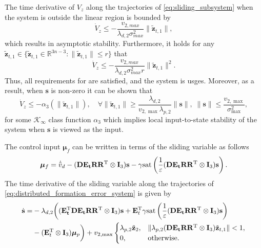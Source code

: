     The time derivative of $V_z$ along the trajectories of \eqref{eq:sliding_subsystem} when the system is outside the linear region is bounded by
    \begin{equation}
        \dot{V}_z \leq -\frac{v_{2,max}}{\lambda_{d,2}\sigma_{max}^2}\|\tilde{\mathbf{z}}_{t,1}\|,
    \end{equation}
which results in asymptotic stability. Furthermore, it holds for any $\tilde{\mathbf{z}}_{t,1} \in \{\tilde{\mathbf{z}}_{t,1} \in \mathbb R^{3n-3} \colon \|\tilde{\mathbf{z}}_{t,1}\| \leq r\}$ that
\begin{equation}
    \dot{V}_z \leq -\frac{v_{2,max}}{\lambda_{d,2}\sigma_{max}^2 r}\|\tilde{\mathbf{z}}_{t,1}\|^2.
\end{equation}
Thus, all requirements for \cite[Theorem 5]{pettersen_lyapunov_2017} are satisfied, and the system is \gls{usges}. Moreover, as a result, when $\mathbf{s}$ is non-zero it can be shown that
\begin{equation}\label{eq:local_iss}
    \dot{V}_z \leq -\alpha_3(\|\tilde{\mathbf{z}}_{t,1}\|), \quad \forall \|\tilde{\mathbf{z}}_{t,1}\| \geq \frac{\lambda_{d,2}}{v_{2,\max}\lambda_{p,2}}\|\mathbf{s}\|,\;
    \|\mathbf{s}\| \leq \frac{v_{2,\max}}{\sigma_{\max}^2}, 
\end{equation}
for some $\mathcal{K}_\infty$ class function $\alpha_3$ which implies local input-to-state stability of the system when $\mathbf{s}$ is viewed as the input.

    The control input $\bm{\mu}_f$ can be written in terms of the sliding variable as follows
    \begin{equation}
        \bm{\mu}_f = \dot{\tilde{v}}_d - (\mathbf{D E_t RR^{\rm T}}\otimes \mathbf{I}_3)\mathbf{s} - \gamma \mathrm{sat}\left(\frac{1}{\varepsilon}(\mathbf{D E_t RR^{\rm T}}\otimes \mathbf{I}_3)\mathbf{s}\right).
    \end{equation}
    The time derivative of the sliding variable along the trajectories of \eqref{eq:distributed_formation_error_system} is given by
    \begin{equation}\label{eq:sliding_derivative}
    \begin{split}
        \dot{\mathbf{s}} = &-\lambda_{d,2} \bigg((\mathbf{E_t^{\rm T} D E_t R R^{\rm T}} \otimes \mathbf{I}_3) \mathbf{s} + \mathbf{E}_t^{\rm T}\gamma \mathrm{sat}\left(\frac{1}{\varepsilon}(\mathbf{DE_t R R^{\rm T}}\otimes \mathbf{I}_3)\mathbf{s}\right)\\
        &- (\mathbf{E}_t^{\rm T}\otimes \mathbf{I}_3) \bm{\mu}_p\bigg) + v_{2,\max} \begin{cases}
            \lambda_{p,2}\tilde{\mathbf{z}}_2, & \|\lambda_{p,2}(\mathbf{DE_t R R^{\rm T}}\otimes \mathbf{I}_3)\tilde{\mathbf{z}}_{t,1}\| < 1,\\
            0, & \textrm{otherwise}.
        \end{cases}       
    \end{split}
    \end{equation}

